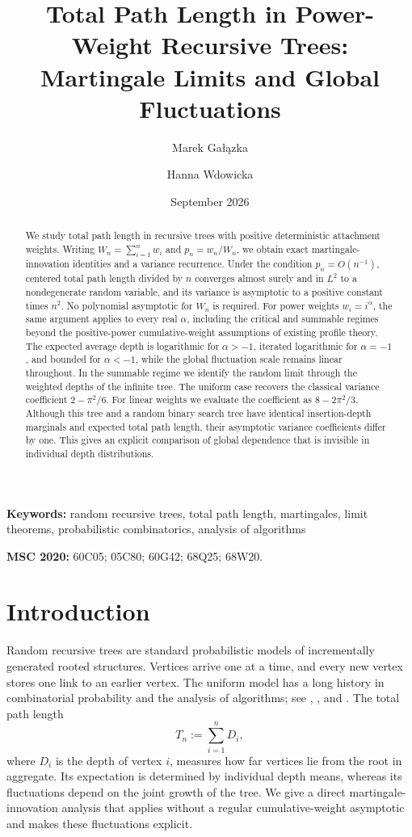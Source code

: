 \documentclass[11pt,a4paper]{article}
\title{\bfseries Total Path Length in Power-Weight Recursive Trees:\\
Martingale Limits and Global Fluctuations}
\author[1]{Marek Ga\l{}\k{a}zka}
\author[2]{Hanna Wdowicka}
\affil[1]{Faculty of Mathematics and Computer Science, Adam Mickiewicz University, Pozna\'n, Poland}
\affil[2]{Department of Statistics, Pozna\'n University of Economics and Business, Poland}
\date{September 2026}
\newcommand{\1}{\mathbf{1}}
\begin{document}
\maketitle
\begin{abstract}
We study total path length in recursive trees with positive deterministic attachment weights.
Writing $W_n=\sum_{i=1}^n w_i$ and $p_n=w_n/W_n$, we obtain exact martingale-innovation identities and a variance recurrence.
Under the condition $p_n=O(n^{-1})$, centered total path length divided by $n$ converges almost surely and in $L^2$ to a nondegenerate random variable, and its variance is asymptotic to a positive constant times $n^2$.
No polynomial asymptotic for $W_n$ is required.
For power weights $w_i=i^\alpha$, the same argument applies to every real $\alpha$, including the critical and summable regimes beyond the positive-power cumulative-weight assumptions of existing profile theory.
The expected average depth is logarithmic for $\alpha>-1$, iterated logarithmic for $\alpha=-1$, and bounded for $\alpha<-1$, while the global fluctuation scale remains linear throughout.
In the summable regime we identify the random limit through the weighted depths of the infinite tree.
The uniform case recovers the classical variance coefficient $2-\pi^2/6$.
For linear weights we evaluate the coefficient as $8-2\pi^2/3$.
Although this tree and a random binary search tree have identical insertion-depth marginals and expected total path length, their asymptotic variance coefficients differ by one.
This gives an explicit comparison of global dependence that is invisible in individual depth distributions.
\end{abstract}

\noindent\textbf{Keywords:} random recursive trees, total path length, martingales, limit theorems, probabilistic combinatorics, analysis of algorithms

\smallskip

\noindent\textbf{MSC 2020:} 60C05; 05C80; 60G42; 68Q25; 68W20.

\section{Introduction}\label{sec:intro}
Random recursive trees are standard probabilistic models of incrementally generated rooted structures.
Vertices arrive one at a time, and every new vertex stores one link to an earlier vertex.
The uniform model has a long history in combinatorial probability and the analysis of algorithms; see
\citet{Szymanski1990}, \citet{SmytheMahmoud1995}, and \citet{Drmota2009}.
The total path length
\[
T_n:=\sum_{i=1}^n D_i,
\]
where $D_i$ is the depth of vertex $i$, measures how far vertices lie from the root in aggregate.
Its expectation is determined by individual depth means, whereas its fluctuations depend on the joint growth of the tree.
We give a direct martingale-innovation analysis that applies without a regular cumulative-weight asymptotic and makes these fluctuations explicit.
\end{document}

